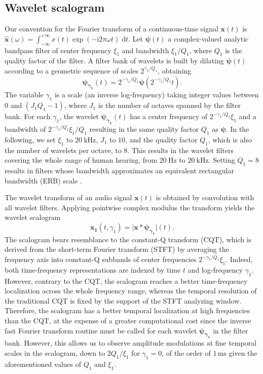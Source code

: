 \documentclass[smallextended]{svjour3}
\begin{document}
\subsection{Wavelet scalogram}
Our convention for the Fourier transform of a continuous-time signal $\boldsymbol{x}(t)$ is $\boldsymbol{\hat{x}}(\omega) = \int_{-\infty}^{+\infty} x(t) \exp(- \mathrm{i} 2\pi \omega t) \; \mathrm{d}t$.
Let $\boldsymbol{\psi}(t)$ a complex-valued analytic bandpass filter of
center frequency $\xi_1$ and bandwidth $\xi_1/Q_1$, where $Q_1$ is the quality factor of the filter.
A filter bank of wavelets is built by dilating $\boldsymbol{\psi}(t)$
according to a geometric sequence of scales $2^{\gamma_1/Q_1}$, obtaining
\begin{equation}
\boldsymbol{\psi_{\gamma_1}}(t) = 2^{-\gamma_1/Q_1} \boldsymbol{\psi}(2^{-\gamma_1/Q_1} t)\mbox{.}
\end{equation}
The variable $\gamma_1$ is a scale (an inverse log-frequency) taking integer values between $0$ and $(J_1 Q_1 - 1)$, where $J_1$ is the number of octaves spanned by the filter bank.
For each $\gamma_1$, the wavelet $\boldsymbol{\psi_{\gamma_1}}(t)$
has a center frequency of $2^{-\gamma_1/Q_1}\xi_1$ and a bandwidth of $2^{-\gamma_1/Q_1}\xi_1/Q_1$ resulting in the same quality factor $Q_1$ as $\boldsymbol{\psi}$.
In the following, we set $\xi_1$ to $20~\mathrm{kHz}$, $J_1$ to $10$, and the quality factor $Q_1$, which is also the number of wavelets per octave, to $8$. This results in the wavelet filters covering the whole range of human hearing, from $20~\mathrm{Hz}$ to $20~\mathrm{kHz}$. Setting $Q_1 = 8$ results in filters whose bandwidth approximates an equivalent rectangular bandwidth (ERB) scale \cite{Fastl2007}.

The wavelet transform of an audio signal
$\boldsymbol{x}(t)$ is obtained by convolution with all wavelet filters.
Applying pointwise complex modulus the transform yields
the wavelet scalogram
\begin{equation}
\boldsymbol{x_1}(t, \gamma_1)
= \vert \boldsymbol{x} \ast \boldsymbol{\psi_{\gamma_1}} \vert (t)\mbox{.}
\end{equation}
The scalogram bears resemblance to the constant-Q transform (CQT),
which is derived from the short-term Fourier transform (STFT) by averaging the frequency
axis into constant-Q subbands of center frequencies $2^{-\gamma_1/Q_1}\xi_1$.
Indeed, both time-frequency representations are indexed by time $t$ and log-frequency $\gamma_1$.
However, contrary to the CQT, the scalogram reaches a better time-frequency localization across the whole
frequency range, whereas the temporal resolution of the traditional CQT is fixed by the support of the STFT analyzing window. %
Therefore, the scalogram has a better temporal localization at high
frequencies than the CQT, at the expense of a greater computational cost
since the inverse fast Fourier transform routine must be called for each wavelet $\boldsymbol{\psi_{\gamma_1}}$ in the filter bank.
However, this allows us to observe amplitude modulations at fine temporal scales in the scalogram, down to $2Q_1/\xi_1$ for $\gamma_1 = 0$, of the order of $1\,\textrm{ms}$ given the aforementioned values of $Q_1$ and $\xi_1$.
\end{document}
